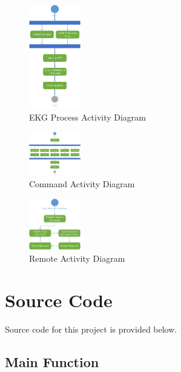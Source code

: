 \documentclass[12pt]{article} %
\begin{document}
		
    \begin{figure}[H]
      \centering
      \includegraphics[width=0.2\textwidth]{../design/ekgProcess_activity.png}
      \caption{EKG Process Activity Diagram}
      \label{fig:ekgProcessActivity}
    \end{figure}
		
    \begin{figure}[H]
      \centering
      \includegraphics[width=0.2\textwidth]{../design/command_activity.png}
      \caption{Command Activity Diagram}
      \label{fig:commandActivity}
    \end{figure}

    \begin{figure}[H]
      \centering
      \includegraphics[width=0.2\textwidth]{../design/remote_activity.png}
      \caption{Remote Activity Diagram}
      \label{fig:remoteActivity}
    \end{figure}

    \pagebreak

    \section{Source Code}

    Source code for this project is provided below.

    \subsection{Main Function}
    
\end{document}
